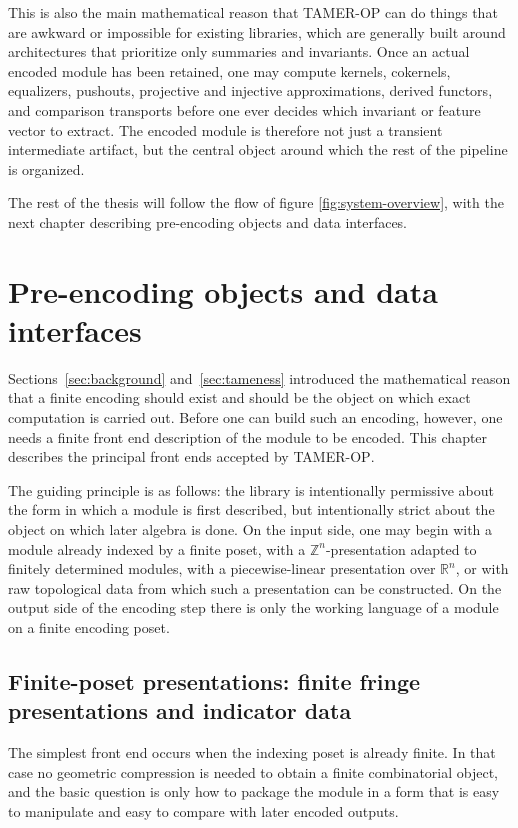 \documentclass[11pt]{article}
\newcommand{\R}{\mathbb{R}}
\newcommand{\TAMER}{\textsc{TAMER-OP}}
\theoremstyle{definition}
\theoremstyle{remark}
\begin{document}
This is also the main mathematical reason that \TAMER{} can do things that are awkward or impossible for existing libraries, which are generally built around architectures that prioritize only summaries and invariants.  Once an actual encoded module has been retained, one may compute kernels, cokernels, equalizers, pushouts, projective and injective approximations, derived functors, and comparison transports before one ever decides which invariant or feature vector to extract.  The encoded module is therefore not just a transient intermediate artifact, but the central object around which the rest of the pipeline is organized.

The rest of the thesis will follow the flow of figure \ref{fig:system-overview}, with the next chapter describing pre-encoding objects and data interfaces.


\section{Pre-encoding objects and data interfaces}\label{sec:pre-encoding}

Sections~\ref{sec:background} and~\ref{sec:tameness} introduced the mathematical reason that a finite encoding should exist and should be the object on which exact computation is carried out.  Before one can build such an encoding, however, one needs a finite front end description of the module to be encoded.  This chapter describes the principal front ends accepted by \TAMER{}.

The guiding principle is as follows: the library is intentionally permissive about the form in which a module is first described, but intentionally strict about the object on which later algebra is done.  On the input side, one may begin with a module already indexed by a finite poset, with a \(\mathbb{Z}^n\)-presentation adapted to finitely determined modules, with a piecewise-linear presentation over \(\R^n\), or with raw topological data from which such a presentation can be constructed.  On the output side of the encoding step there is only the working language of a module on a finite encoding poset.

\subsection{Finite-poset presentations: finite fringe presentations and indicator data}

The simplest front end occurs when the indexing poset is already finite.  In that case no geometric compression is needed to obtain a finite combinatorial object, and the basic question is only how to package the module in a form that is easy to manipulate and easy to compare with later encoded outputs.
\end{document}
